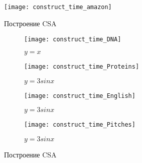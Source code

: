 

\begin{figure}[h!]
	\texttt{[image: construct\_time\_amazon]}
	\caption{Построение CSA}
	\centering
	\label{fig:CSA_construct_time_amazon}
\end{figure}

\begin{figure}[h!]
	\centering
	\begin{subfigure}[b]{0.49\textwidth}
		\centering
		\texttt{[image: construct\_time\_DNA]}
		\caption{$y=x$}
		\label{fig:y equals x}
	\end{subfigure}
	\hfill
	\begin{subfigure}[b]{0.49\textwidth}
		\centering
		\texttt{[image: construct\_time\_Proteins]}
		\caption{$y=3sinx$}
		\label{fig:three sin x}
	\end{subfigure}
	\hfill
	\begin{subfigure}[b]{0.49\textwidth}
		\centering
		\texttt{[image: construct\_time\_English]}
		\caption{$y=3sinx$}
		\label{fig:three sin x}
	\end{subfigure}
	\hfill
	\begin{subfigure}[b]{0.49\textwidth}
		\centering
		\texttt{[image: construct\_time\_Pitches]}
		\caption{$y=3sinx$}
		\label{fig:three sin x}
	\end{subfigure}
	\caption{Построение CSA}
	\label{fig:three graphs}
\end{figure}

